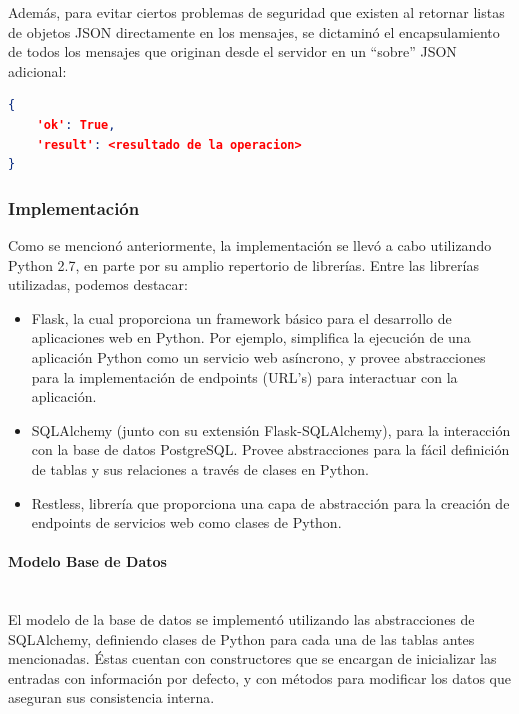 \documentclass[11pt,letterpaper]{article}
\begin{document}
Además, para evitar ciertos problemas de seguridad que existen al retornar listas de objetos JSON directamente en los mensajes, se dictaminó el encapsulamiento de todos los mensajes que originan desde el servidor en un ``sobre'' JSON adicional:

\begin{lstlisting}[language=json, title=Ejemplo de ``sobre'' JSON.]
{
    'ok': True,
    'result': <resultado de la operacion>
}
\end{lstlisting}

\subsubsection{Implementación}

Como se mencionó anteriormente, la implementación se llevó a cabo utilizando Python 2.7, en parte por su amplio repertorio de librerías. Entre las librerías utilizadas, podemos destacar:
\begin{itemize}
    \item Flask\cite{flask}, la cual proporciona un framework básico para el desarrollo de aplicaciones web en Python. Por ejemplo, simplifica la ejecución de una aplicación Python como un servicio web asíncrono, y provee abstracciones para la implementación de endpoints (URL's) para interactuar con la aplicación.
    \item SQLAlchemy\cite{sqlalchemy} (junto con su extensión Flask-SQLAlchemy), para la interacción con la base de datos PostgreSQL. Provee abstracciones para la fácil definición de tablas y sus relaciones a través de clases en Python.
    \item Restless\cite{restless}, librería que proporciona una capa de abstracción para la creación de endpoints de servicios web como clases de Python.
\end{itemize}

\paragraph{Modelo Base de Datos\\\\}

El modelo de la base de datos se implementó utilizando las abstracciones de SQLAlchemy, definiendo clases de Python para cada una de las tablas antes mencionadas. Éstas cuentan con constructores que se encargan de inicializar las entradas con información por defecto, y con métodos para modificar los datos que aseguran sus consistencia interna.\\
\end{document}
